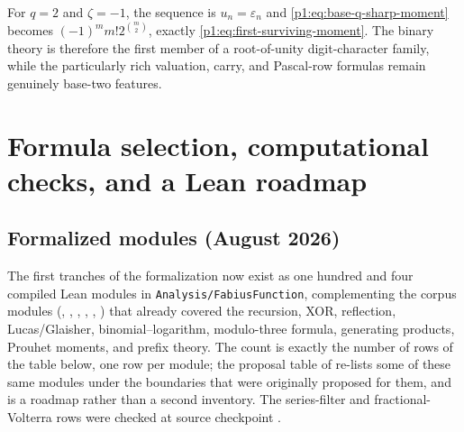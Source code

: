 \documentclass[11pt,oneside]{article}
\numberwithin{equation}{section}
\theoremstyle{definition}
\theoremstyle{remark}
\newcommand{\eps}{\varepsilon}
\newcommand{\repo}{\nolinkurl{Analysis/FabiusFunction}}
\begin{document}
For \(q=2\) and \(\zeta=-1\), the sequence is \(u_n=\eps_n\) and
\eqref{p1:eq:base-q-sharp-moment} becomes
\((-1)^mm!2^{\binom m2}\), exactly
\eqref{p1:eq:first-surviving-moment}.  The binary theory is therefore the first
member of a root-of-unity digit-character family, while the particularly rich
valuation, carry, and Pascal-row formulas remain genuinely base-two features.

\section[Formula selection and Lean roadmap]{Formula selection, computational checks, and a Lean roadmap}
\label{p1:sec:formalization}

\subsection{Formalized modules (August 2026)}
\label{p1:sec:formalized-modules}

The first tranches of the formalization now exist as one hundred and four
compiled Lean modules in \repo{}, complementing the corpus modules
(, , ,
, ,
) that already covered the recursion,
XOR, reflection, Lucas/Glaisher, binomial--logarithm, modulo-three
formula, generating products, Prouhet moments, and prefix theory.  The
count is exactly the number of rows of the table below, one row per
module; the proposal table of  re-lists
some of these same modules under the boundaries that were originally
proposed for them, and is a roadmap rather than a second inventory.  The
series-filter and fractional-Volterra rows were checked at source
checkpoint .
\end{document}
